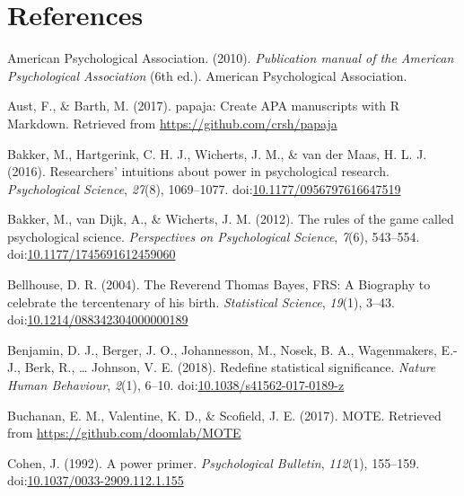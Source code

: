 \documentclass[english,mask,man]{apa6}
\theoremstyle{definition}
\theoremstyle{definition}
\theoremstyle{definition}
\theoremstyle{remark}
\begin{document}
\newpage

\section{References}\label{references}

\setlength{\parindent}{-0.5in} \setlength{\leftskip}{0.5in}

\hypertarget{refs}{}
\hypertarget{ref-AmericanPsychologicalAssociation2010}{}
American Psychological Association. (2010). \emph{Publication manual of
the American Psychological Association} (6th ed.). American
Psychological Association.

\hypertarget{ref-Aust2017}{}
Aust, F., \& Barth, M. (2017). papaja: Create APA manuscripts with R
Markdown. Retrieved from \url{https://github.com/crsh/papaja}

\hypertarget{ref-Bakker2016}{}
Bakker, M., Hartgerink, C. H. J., Wicherts, J. M., \& van der Maas, H.
L. J. (2016). Researchers' intuitions about power in psychological
research. \emph{Psychological Science}, \emph{27}(8), 1069--1077.
doi:\href{https://doi.org/10.1177/0956797616647519}{10.1177/0956797616647519}

\hypertarget{ref-Bakker2012}{}
Bakker, M., van Dijk, A., \& Wicherts, J. M. (2012). The rules of the
game called psychological science. \emph{Perspectives on Psychological
Science}, \emph{7}(6), 543--554.
doi:\href{https://doi.org/10.1177/1745691612459060}{10.1177/1745691612459060}

\hypertarget{ref-Bellhouse2004}{}
Bellhouse, D. R. (2004). The Reverend Thomas Bayes, FRS: A Biography to
celebrate the tercentenary of his birth. \emph{Statistical Science},
\emph{19}(1), 3--43.
doi:\href{https://doi.org/10.1214/088342304000000189}{10.1214/088342304000000189}

\hypertarget{ref-Benjamin2017}{}
Benjamin, D. J., Berger, J. O., Johannesson, M., Nosek, B. A.,
Wagenmakers, E.-J., Berk, R., \ldots{} Johnson, V. E. (2018). Redefine
statistical significance. \emph{Nature Human Behaviour}, \emph{2}(1),
6--10.
doi:\href{https://doi.org/10.1038/s41562-017-0189-z}{10.1038/s41562-017-0189-z}

\hypertarget{ref-Buchanan2017}{}
Buchanan, E. M., Valentine, K. D., \& Scofield, J. E. (2017). MOTE.
Retrieved from \url{https://github.com/doomlab/MOTE}

\hypertarget{ref-Cohen1992a}{}
Cohen, J. (1992). A power primer. \emph{Psychological Bulletin},
\emph{112}(1), 155--159.
doi:\href{https://doi.org/10.1037/0033-2909.112.1.155}{10.1037/0033-2909.112.1.155}
\end{document}
